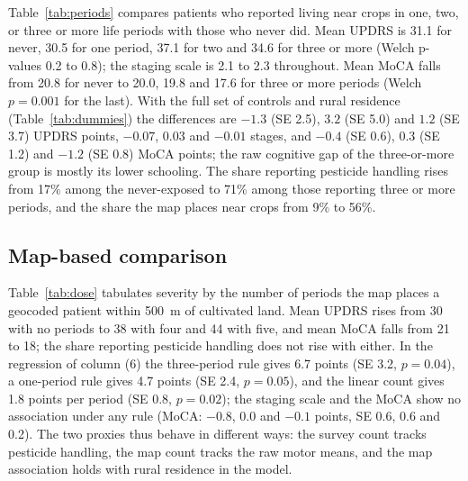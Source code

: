 \documentclass[11pt,a4paper]{article}
\begin{document}
Table~\ref{tab:periods} compares patients who reported living near crops in one, two, or three or more life periods with those who never did. Mean UPDRS is 31.1 for never, 30.5 for one period, 37.1 for two and 34.6 for three or more (Welch p-values 0.2 to 0.8); the staging scale is 2.1 to 2.3 throughout. Mean MoCA falls from 20.8 for never to 20.0, 19.8 and 17.6 for three or more periods (Welch $p=0.001$ for the last). With the full set of controls and rural residence (Table~\ref{tab:dummies}) the differences are $-1.3$ (SE 2.5), $3.2$ (SE 5.0) and $1.2$ (SE 3.7) UPDRS points, $-0.07$, $0.03$ and $-0.01$ stages, and $-0.4$ (SE 0.6), $0.3$ (SE 1.2) and $-1.2$ (SE 0.8) MoCA points; the raw cognitive gap of the three-or-more group is mostly its lower schooling. The share reporting pesticide handling rises from 17\% among the never-exposed to 71\% among those reporting three or more periods, and the share the map places near crops from 9\% to 56\%.

\begin{table}[H]\centering\scriptsize
\caption{Outcomes by number of life periods reported near crops, against patients who always answered "no" (Welch t-test p-values)}\label{tab:periods}

\end{table}

\begin{table}[H]\centering\scriptsize
\caption{Adjusted differences by number of survey periods near crops (reference: never): OLS}\label{tab:dummies}

\end{table}

\subsection{Map-based comparison}

Table~\ref{tab:dose} tabulates severity by the number of periods the map places a geocoded patient within 500~m of cultivated land. Mean UPDRS rises from 30 with no periods to 38 with four and 44 with five, and mean MoCA falls from 21 to 18; the share reporting pesticide handling does not rise with either. In the regression of column (6) the three-period rule gives 6.7 points (SE 3.2, $p=0.04$), a one-period rule gives 4.7 points (SE 2.4, $p=0.05$), and the linear count gives 1.8 points per period (SE 0.8, $p=0.02$); the staging scale and the MoCA show no association under any rule (MoCA: $-0.8$, $0.0$ and $-0.1$ points, SE 0.6, 0.6 and 0.2). The two proxies thus behave in different ways: the survey count tracks pesticide handling, the map count tracks the raw motor means, and the map association holds with rural residence in the model.
\end{document}
